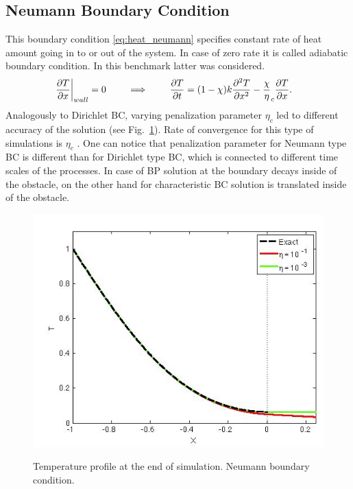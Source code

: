 \subsection{Neumann Boundary Condition}
This boundary condition \eqref{eq:heat_neumann} specifies constant rate of heat amount going in to or out of the system. In case of zero rate it is called adiabatic boundary condition. In this benchmark latter was considered.
\begin{align}
\left.\frac {\partial T}{\partial x}\right|_{wall} = 0 \qquad \implies \qquad \frac {\partial T}{\partial t} &= (1-\chi)k \frac {\partial^2 T}{\partial x^2} - \frac \chi \eta_c \frac {\partial T}{\partial x}. \label{eq:heat_neumann}
\end{align}
Analogously to Dirichlet BC, varying penalization parameter $\eta_c$ led to different accuracy of the solution (see Fig.~\ref{fig:heat_neumann}). Rate of convergence for this type of simulations is $\eta_c$ \cite{ebd_nk_ovv_cbvp_jcp}. One can notice that penalization parameter for Neumann type BC is different than for Dirichlet type BC, which is connected to different time scales of the processes. In case of BP solution at the boundary decays inside of the obstacle, on the other hand for characteristic BC solution is translated inside of the obstacle. 
\begin{figure}[h!]
\centering \includegraphics[scale=0.6]{fig/heat_neumann.png}\\
\caption{Temperature profile at the end of simulation. Neumann boundary condition. \label{fig:heat_neumann}}
\end{figure}

